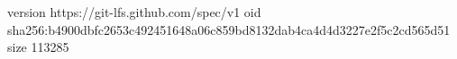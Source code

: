 version https://git-lfs.github.com/spec/v1
oid sha256:b4900dbfc2653c492451648a06c859bd8132dab4ca4d4d3227e2f5c2cd565d51
size 113285

